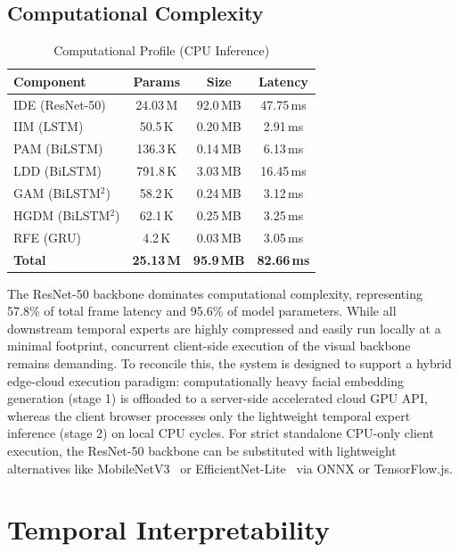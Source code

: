 \documentclass[journal]{IEEEtran}
\begin{document}
\subsection{Computational Complexity}

\begin{table}[t]
\caption{Computational Profile (CPU Inference)}
\label{tab:complexity}
\centering
\footnotesize
\begin{tabular}{@{}lccc@{}}
\toprule
\textbf{Component} & \textbf{Params} & \textbf{Size} & \textbf{Latency} \\
\midrule
IDE (ResNet-50) & 24.03\,M & 92.0\,MB & 47.75\,ms \\
IIM (LSTM) & 50.5\,K & 0.20\,MB & 2.91\,ms \\
PAM (BiLSTM) & 136.3\,K & 0.14\,MB & 6.13\,ms \\
LDD (BiLSTM) & 791.8\,K & 3.03\,MB & 16.45\,ms \\
GAM (BiLSTM$^2$) & 58.2\,K & 0.24\,MB & 3.12\,ms \\
HGDM (BiLSTM$^2$) & 62.1\,K & 0.25\,MB & 3.25\,ms \\
RFE (GRU) & 4.2\,K & 0.03\,MB & 3.05\,ms \\
\midrule
\textbf{Total} & \textbf{25.13\,M} & \textbf{95.9\,MB} & \textbf{82.66\,ms} \\
\bottomrule
\end{tabular}
\end{table}

The ResNet-50 backbone dominates computational complexity, representing 57.8\% of total frame latency and 95.6\% of model parameters. While all downstream temporal experts are highly compressed and easily run locally at a minimal footprint, concurrent client-side execution of the visual backbone remains demanding. To reconcile this, the system is designed to support a hybrid edge-cloud execution paradigm: computationally heavy facial embedding generation (stage 1) is offloaded to a server-side accelerated cloud GPU API, whereas the client browser processes only the lightweight temporal expert inference (stage 2) on local CPU cycles. For strict standalone CPU-only client execution, the ResNet-50 backbone can be substituted with lightweight alternatives like MobileNetV3~\cite{Howard2019} or EfficientNet-Lite~\cite{Tan2019} via ONNX or TensorFlow.js.


\section{Temporal Interpretability}
\label{sec:xai}
\end{document}
